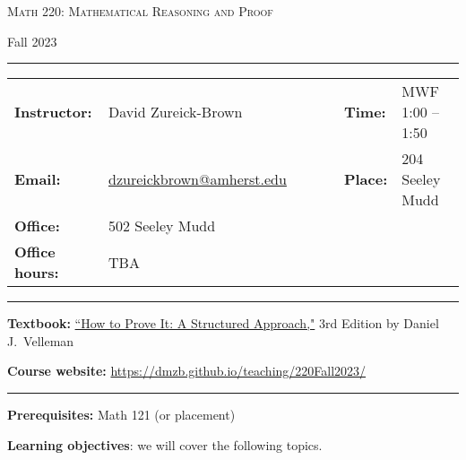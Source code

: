 \documentclass[12pt]{article}
\begin{document}
\begin{center}
{\Large \textsc{Math 220: Mathematical Reasoning and Proof}}
\end{center}
\begin{center}
Fall 2023
\end{center}

\begin{center}
\hrule
\begin{minipage}[t]{.75\textwidth}
\begin{tabular}{llcccll}
\textbf{Instructor:} & David Zureick-Brown & & &  & \textbf{Time:} & MWF 1:00 -- 1:50 \\
  \textbf{Email:} &  \href{mailto: dzureickbrown@amherst.edu}{dzureickbrown@amherst.edu} & & & & \textbf{Place:} & 204 Seeley Mudd \\
  \textbf{Office:} &  502 Seeley Mudd & & & &  & \\
  \textbf{Office hours:} &  TBA & & & &  & 
\end{tabular}
\end{minipage}
\hrule
\end{center}


\noindent\textbf{Textbook:}
\href{https://www.amazon.com/How-Prove-Structured-Daniel-Velleman/dp/1108439535/}
{``How to Prove It: A Structured Approach,"} 3rd Edition by Daniel J.~Velleman
\medskip

\noindent\textbf{Course website:} \url{https://dmzb.github.io/teaching/220Fall2023/}
\medskip

\hrule
\medskip

\noindent\textbf{Prerequisites:} Math 121 (or placement)
\smallskip


\noindent \textbf{Learning objectives}: we will cover the following topics.
\end{document}
